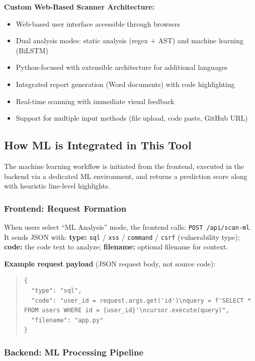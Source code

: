 \textbf{Custom Web-Based Scanner Architecture:}
\begin{itemize}
	\item Web-based user interface accessible through browsers
	\item Dual analysis modes: static analysis (regex + AST) and machine learning (BiLSTM)
	\item Python-focused with extensible architecture for additional languages
	\item Integrated report generation (Word documents) with code highlighting
	\item Real-time scanning with immediate visual feedback
	\item Support for multiple input methods (file upload, code paste, GitHub URL)
\end{itemize}

\subsection{How ML is Integrated in This Tool}
\label{sec:ml_integration}

The machine learning workflow is initiated from the frontend, executed in the backend via a dedicated ML environment, and returns a prediction score along with heuristic line-level highlights.

\subsubsection{Frontend: Request Formation}
\label{sec:ml_frontend_request}

When users select ``ML Analysis'' mode, the frontend calls: \texttt{POST /api/scan-ml}. It sends JSON with: \textbf{type:} \texttt{sql} / \texttt{xss} / \texttt{command} / \texttt{csrf} (vulnerability type); \textbf{code:} the code text to analyze; \textbf{filename:} optional filename for context.

\textbf{Example request payload} (JSON request body, not source code):

\begin{quote}
\small
\begin{verbatim}
{
  "type": "sql",
  "code": "user_id = request.args.get('id')\nquery = f'SELECT * FROM users WHERE id = {user_id}'\ncursor.execute(query)",
  "filename": "app.py"
}
\end{verbatim}
\end{quote}

\subsubsection{Backend: ML Processing Pipeline}
\label{sec:ml_backend_pipeline}

